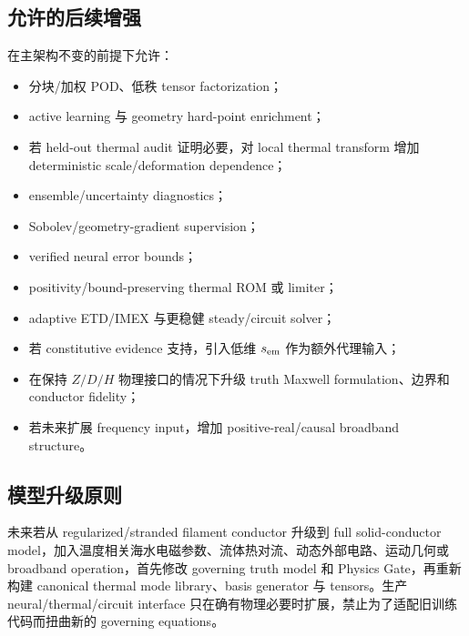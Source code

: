 \subsection{允许的后续增强}
在主架构不变的前提下允许：
\begin{itemize}
  \item 分块/加权 POD、低秩 tensor factorization；
  \item active learning 与 geometry hard-point enrichment；
  \item 若 held-out thermal audit 证明必要，对 local thermal transform 增加 deterministic scale/deformation dependence；
  \item ensemble/uncertainty diagnostics；
  \item Sobolev/geometry-gradient supervision；
  \item verified neural error bounds；
  \item positivity/bound-preserving thermal ROM 或 limiter；
  \item adaptive ETD/IMEX 与更稳健 steady/circuit solver；
  \item 若 constitutive evidence 支持，引入低维 $s_{\rm em}$ 作为额外代理输入；
  \item 在保持 $Z/D/H$ 物理接口的情况下升级 truth Maxwell formulation、边界和 conductor fidelity；
  \item 若未来扩展 frequency input，增加 positive-real/causal broadband structure。
\end{itemize}

\subsection{模型升级原则}
未来若从 regularized/stranded filament conductor 升级到 full solid-conductor model，加入温度相关海水电磁参数、流体热对流、动态外部电路、运动几何或 broadband operation，首先修改 governing truth model 和 Physics Gate，再重新构建 canonical thermal mode library、basis generator 与 tensors。生产 neural/thermal/circuit interface 只在确有物理必要时扩展，禁止为了适配旧训练代码而扭曲新的 governing equations。

